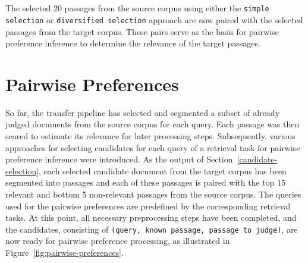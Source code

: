 \\\\
The selected 20 passages from the source corpus using either the \texttt{simple selection} or \texttt{diversified selection} approach are now paired with the selected passages from the target corpus. These pairs serve as the basis for pairwise preference inference to determine the relevance of the target passages.

\section{Pairwise Preferences}\label{pairwise-preferences}

So far, the transfer pipeline has selected and segmented a subset of already judged documents from the source corpus for each query. Each passage was then scored to estimate its relevance for later processing steps. Subsequently, various approaches for selecting candidates for each query of a retrieval task for pairwise preference inference were introduced. As the output of Section~\ref{candidate-selection}, each selected candidate document from the target corpus has been segmented into passages and each of these passages is paired with the top 15 relevant and bottom 5 non-relevant passages from the source corpus. The queries used for the pairwise preferences are predefined by the corresponding retrieval tasks. At this point, all necessary preprocessing steps have been completed, and the candidates, consisting of \texttt{(query, known passage, passage to judge)}, are now ready for pairwise preference processing, as illustrated in Figure~\ref{fig:pairwise-preferences}.
\pagebreak

